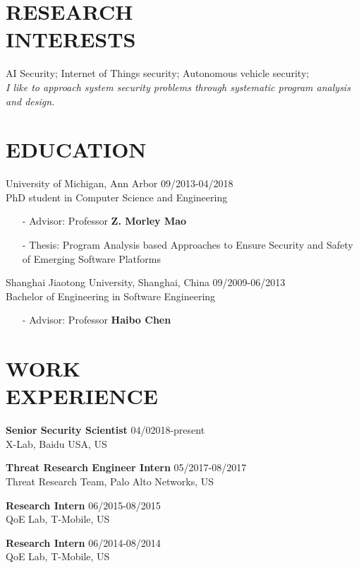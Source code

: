 \documentclass[margin]{res}
\begin{document}
\begin{resume}


\section{RESEARCH \\ INTERESTS}
AI Security; Internet of Things security; Autonomous vehicle security;\\
\textit{I like to approach system security problems through systematic program analysis and design.}




\section{EDUCATION} 
University of Michigan, Ann Arbor \hfill 09/2013-04/2018 \\
PhD student in Computer Science and Engineering
\begin{itemize}
\item[-] Advisor: Professor \textbf{Z. Morley Mao}
\item[-] Thesis: Program Analysis based Approaches to Ensure Security and Safety of Emerging Software Platforms
\end{itemize}

Shanghai Jiaotong University, Shanghai, China \hfill 09/2009-06/2013 \\
Bachelor of Engineering in Software Engineering
\begin{itemize}
\item[-] Advisor: Professor \textbf{Haibo Chen}
\end{itemize}

\section{WORK\\ EXPERIENCE}
\textbf{Senior Security Scientist} \hfill 04/02018-present\\
X-Lab, Baidu USA, US

\textbf{Threat Research Engineer Intern} \hfill 05/2017-08/2017 \\
Threat Research Team, Palo Alto Networks, US

\textbf{Research Intern} \hfill 06/2015-08/2015 \\
QoE Lab, T-Mobile, US

\textbf{Research Intern} \hfill 06/2014-08/2014 \\
QoE Lab, T-Mobile, US


\end{resume}
\end{document}
